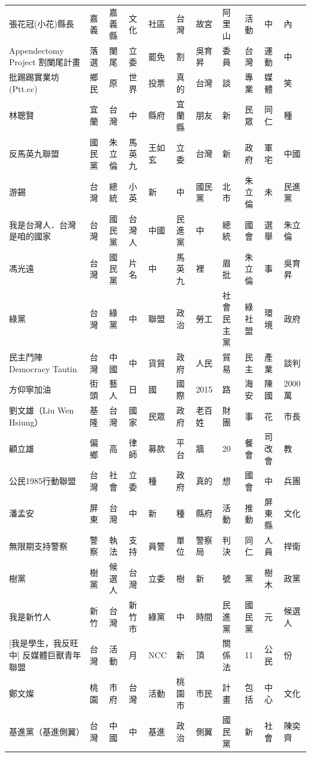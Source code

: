 \documentclass[letterpaper, 10pt, conference]{ieeeconf}   %
\begin{document}
\begin{CJK}{UTF8}{bsmi}
\begin{longtable}[c]{@{}L{2.45cm}L{1.1cm}L{1.1cm}L{1.1cm}L{1.1cm}L{1.1cm}L{1.1cm}L{1.1cm}L{1.1cm}L{1.1cm}L{1.1cm}@{}}
張花冠(小花)縣長 & 嘉義 & 嘉義縣 & 文化 & 社區 & 台灣 & 故宮 & 阿里山 & 活動 & 中 & 內 \\
Appendectomy Project 割闌尾計畫 & 落選 & 闌尾 & 立委 & 罷免 & 割 & 吳育昇 & 委員 & 台灣 & 運動 & 中 \\
批踢踢實業坊(Ptt.cc) & 鄉民 & 原 & 世界 & 投票 & 真的 & 台灣 & 談 & 專業 & 媒體 & 笑 \\
林聰賢 & 宜蘭 & 台灣 & 中 & 縣府 & 宜蘭縣 & 朋友 & 新 & 民眾 & 同仁 & 種 \\
反馬英九聯盟 & 國民黨 & 朱立倫 & 馬英九 & 王如玄 & 立委 & 台灣 & 新 & 政府 & 軍宅 & 中國 \\
游錫\charkun{} & 台灣 & 總統 & 小英 & 新 & 中 & 國民黨 & 北市 & 朱立倫 & 未 & 民進黨 \\
我是台灣人．台灣是咱的國家 & 台灣 & 國民黨 & 台灣人 & 中國 & 民進黨 & 中 & 總統 & 國會 & 選舉 & 朱立倫 \\
馮光遠 & 台灣 & 國民黨 & 片名 & 中 & 馬英九 & 裡 & 眉批 & 朱立倫 & 事 & 吳育昇 \\
綠黨 & 台灣 & 綠黨 & 中 & 聯盟 & 政治 & 勞工 & 社會民主黨 & 綠社盟 & 環境 & 政府 \\
民主鬥陣 Democracy Tautin & 台灣 & 中國 & 中 & 貨貿 & 政府 & 人民 & 貿易 & 民主 & 產業 & 談判 \\
方仰寧加油 & 街頭 & 藝人 & 日 & 國 & 國際 & 2015 & 路 & 海安 & 陳國 & 2000萬 \\
劉文雄（Liu Wen Hsiung） & 基隆 & 台灣 & 國家 & 民眾 & 政府 & 老百姓 & 財團 & 事 & 花 & 市長 \\
顧立雄 & 偏鄉 & 高 & 律師 & 募款 & 平台 & 牆 & 20 & 餐會 & 司改會 & 教 \\
公民1985行動聯盟 & 台灣 & 社會 & 立委 & 種 & 政府 & 真的 & 想 & 國會 & 中 & 兵團 \\
潘孟安 & 屏東 & 台灣 & 中 & 新 & 種 & 縣府 & 活動 & 推動 & 屏東縣 & 文化 \\
無限期支持警察 & 警察 & 執法 & 支持 & 員警 & 單位 & 警察局 & 判決 & 同仁 & 人員 & 捍衛 \\
樹黨 & 樹黨 & 候選人 & 台灣 & 立委 & 樹 & 新 & 號 & 黨 & 樹木 & 政黨 \\
我是新竹人 & 新竹 & 台灣 & 新竹市 & 綠黨 & 中 & 時間 & 民進黨 & 國民黨 & 元 & 候選人 \\
{[}我是學生，我反旺中{]} 反媒體巨獸青年聯盟 & 台灣 & 活動 & 月 & NCC & 新 & 頂 & 關係法 & 11 & 公民 & 份 \\
鄭文燦 & 桃園 & 市府 & 台灣 & 活動 & 桃園市 & 市民 & 計畫 & 包括 & 中心 & 文化 \\
基進黨（基進側翼） & 台灣 & 中國 & 中 & 基進 & 政治 & 側翼 & 國民黨 & 新 & 社會 & 陳奕齊 \\

\end{longtable}
\end{CJK}
\end{document}
